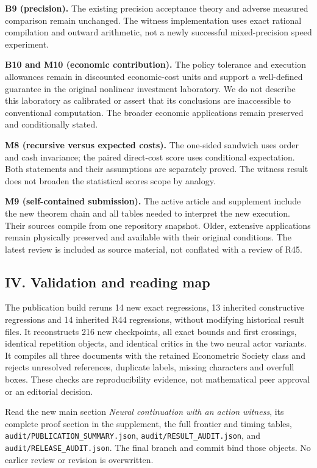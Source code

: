 \documentclass[ecta,nameyear,draft]{econsocart}
\begin{document}
\textbf{B9 (precision).} The existing precision acceptance theory and
adverse measured comparison remain unchanged. The witness implementation
uses exact rational compilation and outward arithmetic, not a newly
successful mixed-precision speed experiment.

\textbf{B10 and M10 (economic contribution).} The policy tolerance and
execution allowances remain in discounted economic-cost units and
support a well-defined guarantee in the original nonlinear investment
laboratory. We do not describe this laboratory as calibrated or assert
that its conclusions are inaccessible to conventional computation. The
broader economic applications remain preserved and conditionally stated.

\textbf{M8 (recursive versus expected costs).} The one-sided sandwich
uses order and cash invariance; the paired direct-cost score uses
conditional expectation. Both statements and their assumptions are
separately proved. The witness result does not broaden the statistical
score\textquotesingle s scope by analogy.

\textbf{M9 (self-contained submission).} The active article and
supplement include the new theorem chain and all tables needed to
interpret the new execution. Their sources compile from one repository
snapshot. Older, extensive applications remain physically preserved and
available with their original conditions. The latest review is included
as source material, not conflated with a review of R45.

\hypertarget{iv-validation-and-reading-map}{%
\subsection{IV. Validation and reading
map}\label{iv-validation-and-reading-map}}

The publication build reruns 14 new exact regressions, 13 inherited
constructive regressions and 14 inherited R44 regressions, without
modifying historical result files. It reconstructs 216 new checkpoints,
all exact bounds and first crossings, identical repetition objects, and
identical critics in the two neural actor variants. It compiles all
three documents with the retained Econometric Society class and rejects
unresolved references, duplicate labels, missing characters and overfull
boxes. These checks are reproducibility evidence, not mathematical peer
approval or an editorial decision.

Read the new main section \emph{Neural continuation with an action
witness}, its complete proof section in the supplement, the full
frontier and timing tables, \nolinkurl{audit/PUBLICATION_SUMMARY.json},
\nolinkurl{audit/RESULT_AUDIT.json}, and
\nolinkurl{audit/RELEASE_AUDIT.json}. The final branch and commit bind
those objects. No earlier review or revision is overwritten.
\end{document}
